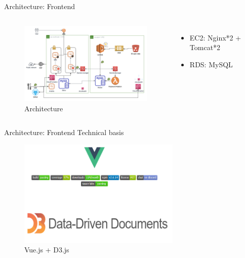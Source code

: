 \documentclass[aspectratio=169]{beamer}
\begin{document}
\begin{frame}[fragile]{Architecture: Frontend}

  \begin{columns}
      \begin{figure}[htbp]
        \centerline{\includegraphics[width=220pt]{images/arch.png}}
        \caption{Architecture}
       \end{figure}

      \begin{itemize}
        \item EC2: Nginx*2 + Tomcat*2
        \pause
        \item RDS: MySQL
      \end{itemize}
  \end{columns}

\end{frame}

\begin{frame}[fragile]{Architecture: Frontend Technical basis}

	\begin{figure}[htbp]
		\centerline{\includegraphics[width=220pt]{images/VueAndD3.png}}
        \caption{Vue.js + D3.js}
    \end{figure}

\end{frame}
\end{document}
